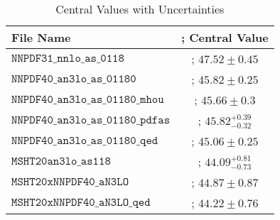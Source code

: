 \begin{table}[h!]
\centering
\caption{Central Values with Uncertainties}
\label{tab:central_values}
\begin{tabular}{l c}
\hline
File Name &; Central Value \\
\hline
$\mathtt{NNPDF31\_nnlo\_as\_0118}$ &; $47.52 \pm 0.45$ \\
$\mathtt{NNPDF40\_an3lo\_as\_01180}$ &; $45.82 \pm 0.25$ \\
$\mathtt{NNPDF40\_an3lo\_as\_01180\_mhou}$ &; $45.66 \pm 0.3$ \\
$\mathtt{NNPDF40\_an3lo\_as\_01180\_pdfas}$ &; $45.82 ^{{+0.39}}_{{-0.32}}$ \\
$\mathtt{NNPDF40\_an3lo\_as\_01180\_qed}$ &; $45.06 \pm 0.25$ \\
$\mathtt{MSHT20an3lo\_as118}$ &; $44.09 ^{{+0.81}}_{{-0.73}}$ \\
$\mathtt{MSHT20xNNPDF40\_aN3LO}$ &; $44.87 \pm 0.87$ \\
$\mathtt{MSHT20xNNPDF40\_aN3LO\_qed}$ &; $44.22 \pm 0.76$ \\
\hline
\end{tabular}
\end{table}
